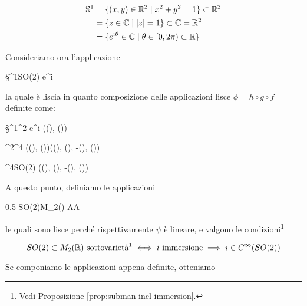 \begin{align}
	\begin{split}
		\mathbb{S}^{1} &= \{ (x,y) \in \mathbb{R}^{2} \mid x^{2} + y^{2} = 1 \} \subset \mathbb{R}^{2} \\
		&= \{ z \in \mathbb{C} \mid \abs{z} = 1 \} \subset \mathbb{C} = \mathbb{R}^{2} \\
		&= \{ e^{i \theta} \in \mathbb{C} \mid \theta \in [0,2\pi) \subset \mathbb{R} \}
	\end{split}
\end{align}

Consideriamo ora l'applicazione

\map{\phi}
	{\S^{1}}{SO(2)}
	{e^{i \theta}}{\bmqty{ \cos(\theta) & \sin(\theta) \\ -\sin(\theta) & \cos(\theta) }}

la quale è liscia in quanto composizione delle applicazioni lisce $ \phi = h \circ g \circ f $ definite come:

	{\S^{1}}{\R^{2}}
	{e^{i \theta}}{(\cos(\theta), \sin(\theta))}

	{\R^{2}}{\R^{4}}
	{(\cos(\theta), \sin(\theta))}{(\cos(\theta), \sin(\theta), -\sin(\theta), \cos(\theta))}

	{\R^{4}}{SO(2)}
	{(\cos(\theta), \sin(\theta), -\sin(\theta), \cos(\theta))}
	{\bmqty{ \cos(\theta) & \sin(\theta) \\ -\sin(\theta) & \cos(\theta) }}

A questo punto, definiamo le applicazioni

	{0.5}{%
				{SO(2)}{M_{2}(\R)}
				{A}{A}
			}

le quali sono lisce perché rispettivamente $ \psi $ è lineare, e valgono le condizioni\footnote{%
	Vedi Proposizione \ref{prop:subman-incl-immersion}.%
}

\begin{equation}
	SO(2) \subset M_{2}(\R) \text{ sottovarietà\footnotemark} %
	\iff %
	i \text{ immersione} %
	\implies %
	i \in C^{\infty}(SO(2))
\end{equation}

Se componiamo le applicazioni appena definite, otteniamo

